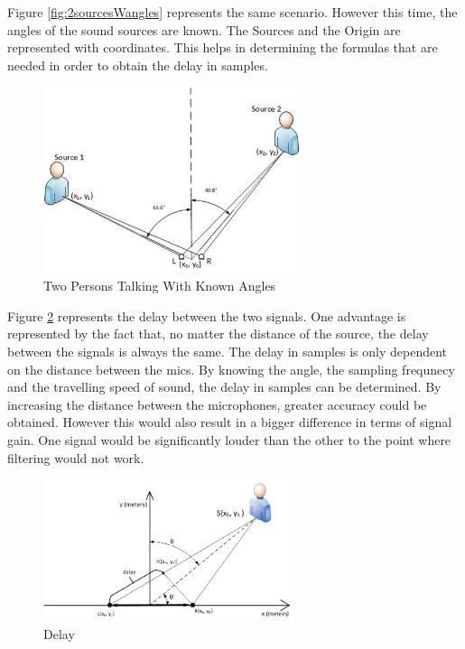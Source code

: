 Figure \ref{fig:2sourcesWangles} represents the same scenario. However this time, the angles
of the sound sources are known. The Sources and the Origin are represented with coordinates.
This helps in determining the formulas that are needed in order to obtain the delay in samples.

\begin{figure}[htp]
	\centering
	\includegraphics[width=0.67\textwidth]{Illustrations/2sourcesWanglesAndPossition.jpg}
	\caption{Two Persons Talking With Known Angles}
	\label{fig:2sourcesWanglesAndPossition}
\end{figure}

\newpage

Figure \ref{fig:zoomedin1} represents the delay between the two signals. One advantage
is represented by the fact that, no matter the distance of the source, the delay between the
signals is always the same. The delay in samples is only dependent on the distance between the mics.
By knowing the angle, the sampling frequnecy and the travelling speed of sound, the delay in 
samples can be determined. By increasing the distance between the microphones, greater accuracy 
could be obtained. However this would also result in a bigger difference in terms of signal gain.
One signal would be significantly louder than the other to the point where filtering would not work.


\begin{figure}[htp]
	\centering
	\includegraphics[width=0.65\textwidth]{Illustrations/delayDrawingForEquations.jpg}
	\caption{Delay}
	\label{fig:zoomedin1}
\end{figure}

